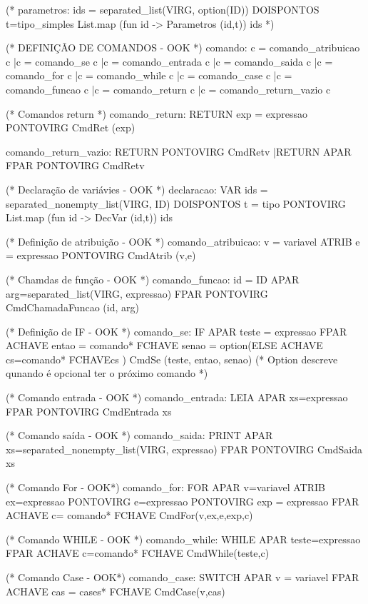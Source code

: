 \documentclass[12pt,a4paper,twoside]{article}
\begin{document}
\begin{terminal}
(* parametros: ids = separated_list(VIRG, option(ID)) DOISPONTOS t=tipo_simples {List.map (fun id -> Parametros (id,t)) ids } *)

(* DEFINIÇÃO DE COMANDOS 					- OOK *)
comando: c = comando_atribuicao 		{ c } 
		|c = comando_se 				{ c } 
		|c = comando_entrada 			{ c } 
		|c = comando_saida 				{ c } 
		|c = comando_for 				{ c } 
		|c = comando_while 				{ c } 
		|c = comando_case				{ c } 
		|c = comando_funcao 			{ c }
		|c = comando_return				{ c }
		|c = comando_return_vazio		{ c }

(* Comandos return *)
comando_return: RETURN exp = expressao PONTOVIRG				{CmdRet (exp)}

comando_return_vazio: RETURN PONTOVIRG					{CmdRetv}
					 |RETURN APAR FPAR PONTOVIRG		{CmdRetv}

(* Declaração de variávies					- OOK *)
declaracao: VAR ids = separated_nonempty_list(VIRG, ID) DOISPONTOS t = tipo PONTOVIRG {List.map (fun id -> DecVar (id,t)) ids }

(* Definição de atribuição 					- OOK *)
comando_atribuicao: v = variavel ATRIB e = expressao PONTOVIRG {CmdAtrib (v,e)}

(* Chamdas de função						- OOK *)
comando_funcao: id = ID APAR  arg=separated_list(VIRG, expressao) FPAR PONTOVIRG
					{CmdChamadaFuncao (id, arg)}

(* Definição de IF		 					- OOK *)
comando_se:	IF APAR teste = expressao FPAR ACHAVE
				entao = comando*
			FCHAVE
				senao = option(ELSE ACHAVE cs=comando* FCHAVE{cs} ) {CmdSe (teste, entao, senao)}
			(* Option descreve qunando é opcional ter o próximo comando *)

(* Comando entrada 							- OOK *)
comando_entrada: LEIA APAR xs=expressao FPAR PONTOVIRG {CmdEntrada xs}

(* Comando saída 							- OOK *)
comando_saida: PRINT APAR xs=separated_nonempty_list(VIRG, expressao) FPAR PONTOVIRG { CmdSaida xs }

(* Comando For								- OOK*)
comando_for: FOR APAR v=variavel ATRIB ex=expressao PONTOVIRG e=expressao PONTOVIRG exp = expressao FPAR ACHAVE
							c= comando* 
						FCHAVE { CmdFor(v,ex,e,exp,c) }

(* Comando WHILE 							- OOK *)
comando_while: WHILE APAR teste=expressao FPAR ACHAVE c=comando* FCHAVE {CmdWhile(teste,c)}

(* Comando Case								- OOK*)
comando_case: SWITCH APAR v = variavel FPAR ACHAVE 
				cas = cases* FCHAVE {CmdCase(v,cas)}


\end{terminal}
\end{document}
